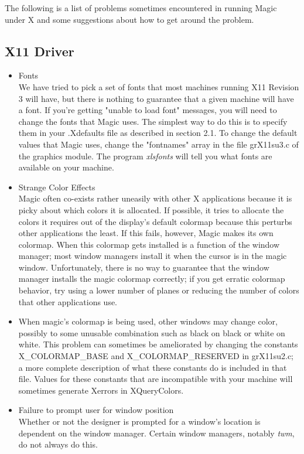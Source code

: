 \documentclass[letterpaper,twoside,12pt]{article}
\begin{document}
The following is a list of problems sometimes encountered in running Magic
under X and some suggestions about how to get around the problem.

\subsection{X11 Driver}

\begin{itemize}
\item Fonts \\
We have tried to pick a set of fonts that most machines running
X11 Revision 3 will have, but there is nothing to guarantee that
a given machine will have a font. If you're getting "unable to load font"
messages, you will need to change the fonts that Magic uses.  The simplest 
way to do this is to specify them in your .Xdefaults file as described in
section 2.1. To change the default values that Magic uses, change the 
"fontnames" array in the file grX11su3.c of the graphics module.
The program {\itshape xlsfonts} will tell you what fonts are available on your
machine.

\item Strange Color Effects \\
Magic often co-exists rather uneasily with 
other X applications because it is picky about which colors it is allocated.
If possible, it tries to allocate the colors it requires out of the 
display's default colormap because this perturbs other applications the least.
If this fails, however, Magic makes its own colormap.  When this colormap
gets installed is a function of the window manager; most window managers 
install it when the cursor is in the magic window.  Unfortunately, there is
no way to guarantee that the window manager installs the magic colormap 
correctly;  if you get erratic colormap behavior, try using a lower number 
of planes or reducing the number of colors that other applications use.

\item
When magic's colormap is being used, other windows may change color, 
possibly to some unusable combination such as black on black or white 
on white.  This problem can sometimes be ameliorated by changing the 
constants X{\_}COLORMAP{\_}BASE and X{\_}COLORMAP{\_}RESERVED in grX11su2.c;
a more complete
description of what these constants do is included in that file.
Values for these constants that are incompatible with your machine
will sometimes generate Xerrors in XQueryColors.

\item Failure to prompt user for window position \\
Whether or not the 
designer is prompted for a window's location is dependent on the window 
manager.  Certain window managers, notably {\itshape twm}, do not always 
do this.
\end{itemize}
\end{document}
